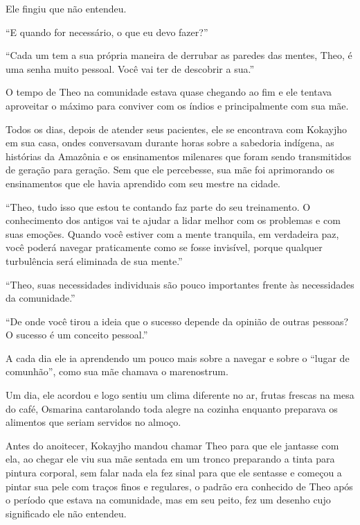 Ele fingiu que não entendeu.

``E quando for necessário, o que eu devo fazer?''

``Cada um tem a sua própria maneira de derrubar as paredes das mentes,
Theo, é uma senha muito pessoal. Você vai ter de descobrir a sua.''

\asterisc


O tempo de Theo na comunidade estava quase chegando ao fim e ele tentava
aproveitar o máximo para conviver com os índios e principalmente com sua
mãe.

Todos os dias, depois de atender seus pacientes, ele se encontrava com
Kokayjho em sua casa, ondes conversavam durante horas sobre a sabedoria
indígena, as histórias da Amazônia e os ensinamentos milenares que foram
sendo transmitidos de geração para geração. Sem que ele percebesse, sua
mãe foi aprimorando os ensinamentos que ele havia aprendido com seu
mestre na cidade.

``Theo, tudo isso que estou te contando faz parte do seu treinamento. O
conhecimento dos antigos vai te ajudar a lidar melhor com os problemas e
com suas emoções. Quando você estiver com a mente tranquila, em
verdadeira paz, você poderá navegar praticamente como se fosse
invisível, porque qualquer turbulência será eliminada de sua mente.''

``Theo, suas necessidades individuais são pouco importantes frente às
necessidades da comunidade.''

``De onde você tirou a ideia que o sucesso depende da opinião de outras
pessoas? O sucesso é um conceito pessoal.''

A cada dia ele ia aprendendo um pouco mais sobre a navegar e sobre o
``lugar de comunhão'', como sua mãe chamava o marenostrum.

Um dia, ele acordou e logo sentiu um clima diferente no ar, frutas
frescas na mesa do café, Osmarina cantarolando toda alegre na cozinha
enquanto preparava os alimentos que seriam servidos no almoço.

Antes do anoitecer, Kokayjho mandou chamar Theo para que ele jantasse
com ela, ao chegar ele viu sua mãe sentada em um tronco preparando a
tinta para pintura corporal, sem falar nada ela fez sinal para que ele
sentasse e começou a pintar sua pele com traços finos e regulares, o
padrão era conhecido de Theo após o período que estava na comunidade,
mas em seu peito, fez um desenho cujo significado ele não entendeu.

